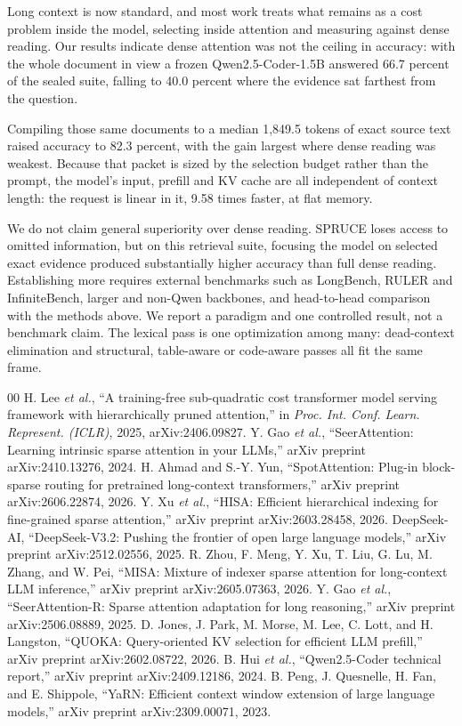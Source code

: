 \documentclass[conference]{IEEEtran}
\begin{document}
Long context is now standard, and most work treats what remains as a cost problem
inside the model, selecting inside attention and measuring against dense
reading. Our results indicate dense attention
was not the ceiling in accuracy: with the whole document in view a frozen
Qwen2.5-Coder-1.5B answered 66.7 percent of the sealed suite, falling to 40.0 percent
where the evidence sat farthest from the question.

Compiling those same documents to a median 1,849.5 tokens of exact source text
raised accuracy to 82.3 percent, with the gain largest where dense reading was
weakest. Because that packet is sized by the selection budget rather than the prompt,
the model's input, prefill and KV cache are all independent of context length: the
request is linear in it, 9.58 times faster, at flat memory.

We do not claim general superiority over dense reading. SPRUCE loses access to
omitted information, but on this retrieval suite, focusing the model on selected
exact evidence produced substantially higher accuracy than full dense reading.
Establishing more requires external benchmarks such as LongBench, RULER and
InfiniteBench, larger and non-Qwen backbones, and head-to-head comparison with the
methods above. We report a paradigm and one controlled result, not a benchmark
claim. The lexical pass is one optimization among many: dead-context elimination and structural, table-aware or code-aware passes all fit the
same frame.

\begin{thebibliography}{00}
 H. Lee \textit{et al.}, ``A training-free sub-quadratic cost transformer model serving framework with hierarchically pruned attention,'' in \textit{Proc. Int. Conf. Learn. Represent. (ICLR)}, 2025, arXiv:2406.09827.
 Y. Gao \textit{et al.}, ``SeerAttention: Learning intrinsic sparse attention in your LLMs,'' arXiv preprint arXiv:2410.13276, 2024.
 H. Ahmad and S.-Y. Yun, ``SpotAttention: Plug-in block-sparse routing for pretrained long-context transformers,'' arXiv preprint arXiv:2606.22874, 2026.
 Y. Xu \textit{et al.}, ``HISA: Efficient hierarchical indexing for fine-grained sparse attention,'' arXiv preprint arXiv:2603.28458, 2026.
 DeepSeek-AI, ``DeepSeek-V3.2: Pushing the frontier of open large language models,'' arXiv preprint arXiv:2512.02556, 2025.
 R. Zhou, F. Meng, Y. Xu, T. Liu, G. Lu, M. Zhang, and W. Pei, ``MISA: Mixture of indexer sparse attention for long-context LLM inference,'' arXiv preprint arXiv:2605.07363, 2026.
 Y. Gao \textit{et al.}, ``SeerAttention-R: Sparse attention adaptation for long reasoning,'' arXiv preprint arXiv:2506.08889, 2025.
 D. Jones, J. Park, M. Morse, M. Lee, C. Lott, and H. Langston, ``QUOKA: Query-oriented KV selection for efficient LLM prefill,'' arXiv preprint arXiv:2602.08722, 2026.
 B. Hui \textit{et al.}, ``Qwen2.5-Coder technical report,'' arXiv preprint arXiv:2409.12186, 2024.
 B. Peng, J. Quesnelle, H. Fan, and E. Shippole, ``YaRN: Efficient context window extension of large language models,'' arXiv preprint arXiv:2309.00071, 2023.
\end{thebibliography}
\end{document}
